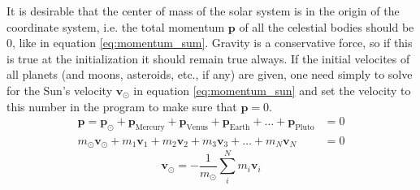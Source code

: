 %
%
%
%
%


It is desirable that the center of mass of the solar system is in the origin of the coordinate system, i.e. the total momentum $\mathbf{p}$ of all the celestial bodies should be $0$, like in equation \ref{eq:momentum_sum}. Gravity is a conservative force, so if this is true at the initialization it should remain true always. If the initial velocites of all planets (and moons, asteroids, etc., if any) are given, one need simply to solve for the Sun's velocity $\mathbf{v}_\odot$ in equation \ref{eq:momentum_sun} and set the velocity to this number in the program to make sure that $\mathbf{p} = 0$.
\begin{align}
	\label{eq:momentum_sum}
	\mathbf{p} =
	\mathbf{p}_\odot
	+ \mathbf{p}_\textrm{Mercury}
	+ \mathbf{p}_\textrm{Venus}
	+ \mathbf{p}_\textrm{Earth}
	+ \dots
	+ \mathbf{p}_\textrm{Pluto}
	&= 0 \\
	\label{eq:momentum_sun}
	m_\odot \mathbf{v}_\odot
	+ m_1 \mathbf{v}_1
	+ m_2 \mathbf{v}_2
	+ m_3 \mathbf{v}_3
	+ \dots
	+ m_N \mathbf{v}_N
	&= 0
\end{align}
$$
	\mathbf{v}_\odot = - \frac{1}{m_\odot} \sum_i^N m_i \mathbf{v}_i
$$

